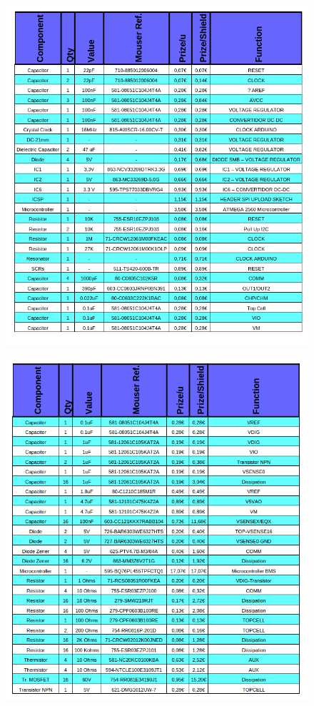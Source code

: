 \begin{figure}[H]
	\centering
    \includegraphics[width=\textwidth, height=\textheight] {Pressupost/componentsp1.png}
\end{figure}

\begin{figure}[H]
	\centering
    \includegraphics[width=\textwidth, height=\textheight] {Pressupost/componentsp2.png}
\end{figure}